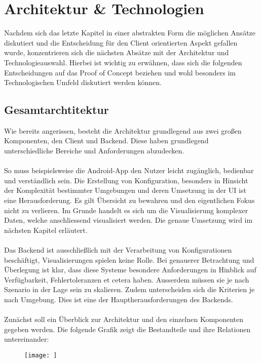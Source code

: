 \chapter{Architektur & Technologien}
Nachdem sich das letzte Kapitel in einer abstrakten Form die möglichen Ansätze diskutiert und die Entscheidung für den Client orientierten Aspekt gefallen wurde, konzentrieren sich die nächsten Absätze mit der Architektur und Technologieauswahl. 
Hierbei ist wichtig zu erwähnen, dass sich die folgenden Entscheidungen auf das Proof of Concept beziehen und wohl besonders im Technologischen Umfeld diskutiert werden können.

\section{Gesamtarchtitektur}
Wie bereits angerissen, besteht die Architektur grundlegend aus zwei großen Komponenten, den Client und Backend. Diese haben grundlegend unterschiedliche Bereiche und Anforderungen abzudecken. 
\\\\
So muss beispielsweise die Android-App den Nutzer leicht zugänglich, bedienbar und verständlich sein. Die Erstellung von Konfiguration, besonders in Hinsicht der Komplexität bestimmter Umgebungen und deren Umsetzung in der UI ist eine Herausforderung. Es gilt Übersicht zu bewahren und den eigentlichen Fokus nicht zu verlieren. Im Grunde handelt es sich um die Visualisierung komplexer Daten, welche anschliessend visualisiert werden. Die genaue Umsetzung wird im nächsten Kapitel erläutert. 
\\\\
Das Backend ist ausschließlich mit der Verarbeitung von Konfigurationen beschäftigt, Visualisierungen spielen keine Rolle. Bei genauerer Betrachtung und Überlegung ist klar, dass diese Systeme besondere Anforderungen in Hinblick auf Verfügbarkeit, Fehlertoleranzen et cetera haben. Ausserdem müssen sie je nach Szenario in der Lage sein zu skalieren. Zudem unterscheiden sich die Kriterien je nach Umgebung. Dies ist eine der Hauptherausforderungen des Backends. 
\\\\
Zunächst soll ein Überblick zur Architektur und den einzelnen Komponenten gegeben werden. Die folgende Grafik zeigt die Bestandteile und ihre Relationen untereinander:

\begin{figure}[H]
\texttt{[image: ]}
\caption{}
\end{figure}

